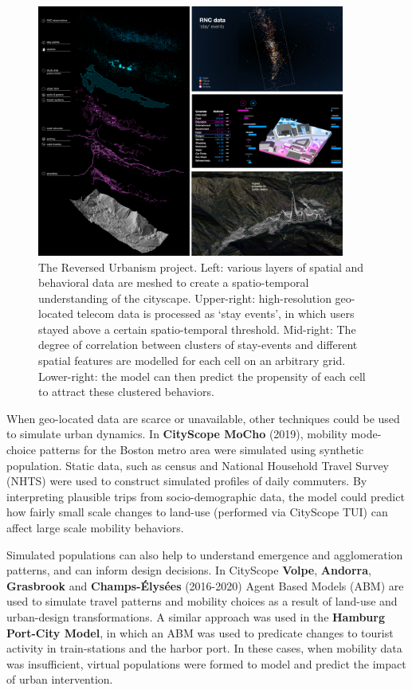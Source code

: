 \begin{figure}[t]
\begin{center}
    \includegraphics[width=0.9\textwidth]{figures/revurb.png}
\end{center}
   \caption{The Reversed Urbanism project. Left: various layers of spatial and behavioral data are meshed to create a spatio-temporal understanding of the cityscape. Upper-right: high-resolution geo-located telecom data is processed as `stay events', in which users stayed above a certain spatio-temporal threshold. Mid-right: The degree of correlation between clusters of stay-events and different spatial features are modelled for each cell on an arbitrary grid. Lower-right: the model can then predict the propensity of each cell to attract these clustered behaviors.}
   
\label{fig:revurb}
\end{figure}

{When geo-located data are scarce or unavailable, other techniques could be used to simulate urban dynamics. In \textbf{CityScope MoCho} (2019), mobility mode-choice patterns for the Boston metro area were simulated using synthetic population. Static data, such as census and National Household Travel Survey (NHTS) were used to construct simulated profiles of daily commuters. By interpreting plausible trips from socio-demographic data, the model could predict how fairly small scale changes to land-use (performed via CityScope TUI) can affect large scale mobility behaviors.}

{Simulated populations can also help to understand emergence and agglomeration patterns, and can inform design decisions. In CityScope \textbf{Volpe}, \textbf{Andorra}, \textbf{Grasbrook} and \textbf{Champs-Élysées} (2016-2020) Agent Based Models (ABM) are used to simulate travel patterns and mobility choices as a result of land-use and urban-design transformations. A similar approach was used in the \textbf{Hamburg Port-City Model}, in which an ABM was used to predicate changes to tourist activity in train-stations and the harbor port. In these cases, when mobility data was insufficient, virtual populations were formed to model and predict the impact of urban intervention. }


